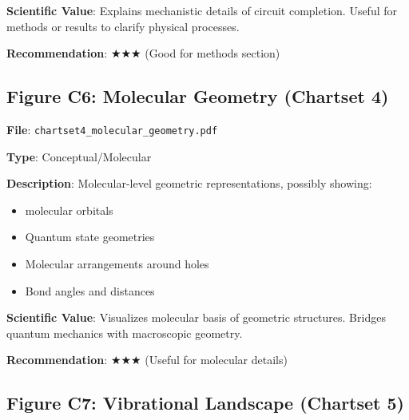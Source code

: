\documentclass[11pt]{article}
\begin{document}
\textbf{Scientific Value}:
Explains mechanistic details of circuit completion. Useful for methods or results to clarify physical processes.

\textbf{Recommendation}: $\bigstar\bigstar\bigstar$ (Good for methods section)

\subsection{Figure C6: Molecular Geometry (Chartset 4)}


\textbf{File}: \texttt{chartset4\_molecular\_geometry.pdf}

\textbf{Type}: Conceptual/Molecular

\textbf{Description}:
Molecular-level geometric representations, possibly showing:
\begin{itemize}
\item {} molecular orbitals
\item Quantum state geometries
\item Molecular arrangements around holes
\item Bond angles and distances
\end{itemize}

\textbf{Scientific Value}:
Visualizes molecular basis of geometric structures. Bridges quantum mechanics with macroscopic geometry.

\textbf{Recommendation}: $\bigstar\bigstar\bigstar$ (Useful for molecular details)

\subsection{Figure C7: Vibrational Landscape (Chartset 5)}

\end{document}
